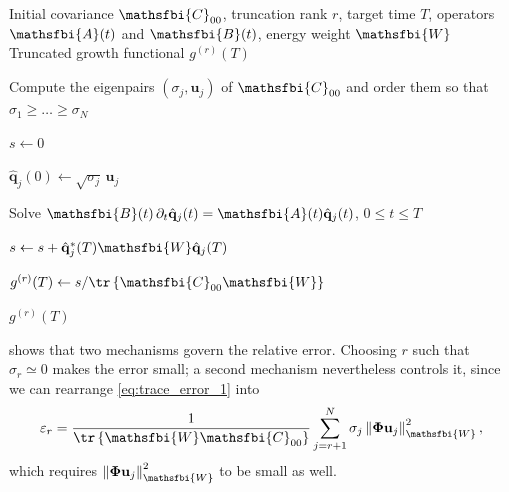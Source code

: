 \begin{algorithm}[H]
  \caption{Deterministic truncation (DCT) estimate of \(g(T)\)}
  \label{alg:deterministic_truncation}

  \begin{algorithmic}[1]
    \Require Initial covariance \(\mathsfbi{C}_{00}\), truncation rank \(r\),
             target time \(T\), operators \(\mathsfbi{A}(t)\) and \(\mathsfbi{B}(t)\),
             energy weight \(\mathsfbi{W}\)
    \Ensure Truncated growth functional \(g^{(r)}(T)\)

    \State Compute the eigenpairs \((\sigma_j,\mathbf{u}_j)\) of \(\mathsfbi{C}_{00}\)
      and order them so that \(\sigma_1\geq\dots\geq\sigma_N\)

    \State \(s\gets0\)

      \State \(\hat{\mathbf{q}}_j(0)\gets\sqrt{\sigma_j}\,\mathbf{u}_j\)

      \State Solve
        \(\mathsfbi{B}(t)\,\partial_t\hat{\mathbf{q}}_j(t)
        =
        \mathsfbi{A}(t)\hat{\mathbf{q}}_j(t)\),
        \(0\leq t\leq T\)

      \State \(s\gets s+\hat{\mathbf{q}}_j^{*}(T)\mathsfbi{W}\hat{\mathbf{q}}_j(T)\)
    \EndFor

    \State \(g^{(r)}(T)\gets s/\tr\left\{\mathsfbi{C}_{00}\mathsfbi{W}\right\}\)

    \State \Return \(g^{(r)}(T)\)
  \end{algorithmic}
\end{algorithm}

 shows that two mechanisms govern the relative error. Choosing \(r\) such
that \(\sigma_r\simeq0\) makes the error small; a second mechanism nevertheless controls it, since
we can rearrange \eqref{eq:trace_error_1} into
\begin{equation}
  \varepsilon_r
  =
  \frac{1}{\tr\left\{\mathsfbi{W}\mathsfbi{C}_{00}\right\}}
  \sum_{j=r+1}^{N}
  \sigma_j
  \left\|\boldsymbol{\Phi}\mathbf{u}_j\right\|_{\mathsfbi{W}}^{2},
  \label{eq:trace_error_phi_tail}
\end{equation}
which requires \(\left\|\boldsymbol{\Phi}\mathbf{u}_j\right\|_{\mathsfbi{W}}^{2}\) to be small as
well.

